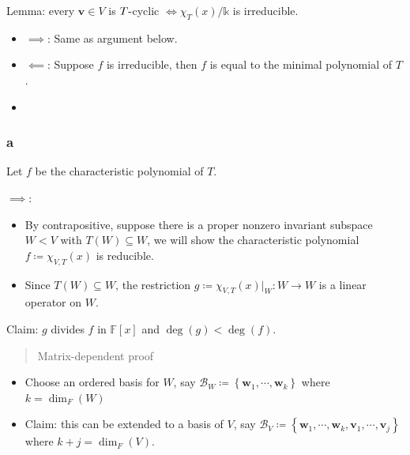 \begin{solution}

Lemma: every \(\mathbf{v}\in V\) is \(T{\hbox{-}}\)cyclic
\(\iff \chi_T(x)/{\mathbb{k}}\) is irreducible.

\begin{itemize}
\tightlist
\item
  \(\implies\): Same as argument below.
\item
  \(\impliedby\): Suppose \(f\) is irreducible, then \(f\) is equal to
  the minimal polynomial of \(T\).
\item
\end{itemize}

\hypertarget{a-106}{%
\subsubsection{a}\label{a-106}}

Let \(f\) be the characteristic polynomial of \(T\).

\(\implies\):

\begin{itemize}
\tightlist
\item
  By contrapositive, suppose there is a proper nonzero invariant
  subspace \(W<V\) with \(T(W) \subseteq W\), we will show the
  characteristic polynomial \(f \coloneqq\chi_{V, T}(x)\) is reducible.
\item
  Since \(T(W)\subseteq W\), the restriction
  \(g\coloneqq\chi_{V, T}(x) \mathrel{\Big|}_W: W\to W\) is a linear
  operator on \(W\).
\end{itemize}

Claim: \(g\) divides \(f\) in \({\mathbb{F}}[x]\) and
\(\deg(g) < \deg(f)\).

\begin{quote}
Matrix-dependent proof
\end{quote}

\begin{itemize}
\item
  Choose an ordered basis for \(W\), say
  \({\mathcal{B}}_W \coloneqq\left\{{\mathbf{w}_1, \cdots, \mathbf{w}_k}\right\}\)
  where \(k=\dim_F(W)\)
\item
  Claim: this can be extended to a basis of \(V\), say
  \({\mathcal{B}}_V \coloneqq\left\{{\mathbf{w}_1, \cdots, \mathbf{w}_k, \mathbf{v}_1, \cdots, \mathbf{v}_j}\right\}\)
  where \(k+j = \dim_F(V)\).


\end{itemize}
\end{solution}
